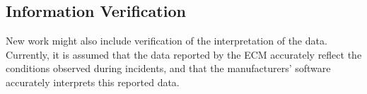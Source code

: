 \subsection{Information Verification}

New work might also include verification of the interpretation of the data. Currently, it is assumed that the data reported by the ECM accurately reflect the conditions
observed during incidents, and that the manufacturers' software accurately interprets this reported data. 

